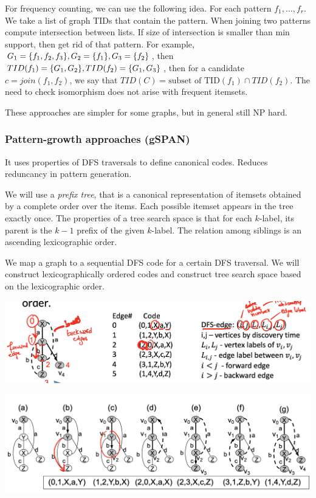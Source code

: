     For frequency counting, we can use the following idea. For each pattern $f_1, \dots, f_r$. We take a list of graph TIDs that contain the pattern. When joining two patterns compute intersection between lists. If size of intersection is smaller than min support, then get rid of that pattern. For example, $G_1 = \{f_1, f_2, f_3\}, G_2 = \{f_1\}, G_3 = \{f_2\}$, then $TID(f_1) = \{G_1, G_2\}, TID(f_2) = \{G_1, G_3\}$, then for a candidate $c = join(f_1, f_2)$, we say that $TID(C) = \text{subset of TID}(f_1) \cap TID(f_2)$. The need to check isomorphism does not arise with frequent itemsets. 
    
    These approaches are simpler for some graphs, but in general still NP hard.
    
\subsubsection{Pattern-growth approaches (gSPAN)}
    It uses properties of DFS traversals to define canonical codes. Reduces reduncancy in pattern generation. 
    
    We will use a \emph{prefix tree}, that is a canonical representation of itemsets obtained by a complete order over the items. Each possible itemset appears in the tree exactly once. The properties of a tree search space is that for each $k$-label, its parent is the $k-1$ prefix of the given $k$-label. The relation among siblings is an ascending lexicographic order.
    
    We map a graph to a sequential DFS code for a certain DFS traversal. We will construct lexicographically ordered codes and construct tree search space based on the lexicographic order. 

    \begin{center}
        \includegraphics[width=1\textwidth]{images/dfs1.png}
    \end{center}
        \begin{center}
        \includegraphics[width=1\textwidth]{images/dfs2.png}
    \end{center}
    
